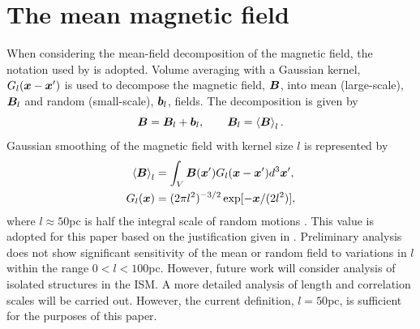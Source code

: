 \documentclass[useAMS,usenatbib]{mn2e}
\begin{document}
\section{The mean magnetic field}
When considering the mean-field decomposition of the magnetic field, the notation used by \citep{GSSFM13} is adopted.
Volume averaging with a Gaussian kernel, $G_{l}(\boldsymbol{x}-\boldsymbol{x}')$ is used to decompose the magnetic field, $\boldsymbol{B}$, into mean (large-scale), $\boldsymbol{B}_{l}$ and random (small-scale), $\boldsymbol{b}_{l}$, fields. The decomposition is given by 
\begin{equation}
\boldsymbol{B} = \boldsymbol{B}_{l}+\boldsymbol{b}_{l},\qquad \boldsymbol{B}_{l} = \left<\boldsymbol{B}\right>_{l}. \label{decomp} 
\end{equation}
Gaussian smoothing of the magnetic field with kernel size $l$ is represented by
\begin{align}
\left<\boldsymbol{B}\right>_{l}&=\int_{V}\boldsymbol{B}(\boldsymbol{x}')G_{l}(\boldsymbol{x}-\boldsymbol{x}')d^{3}\boldsymbol{x}',\\
G_{l}(\boldsymbol{x})&=(2\pi l^2)^{-3/2}\exp[-\boldsymbol{x}/(2l^2)],\nonumber
\label{gauss}
\end{align} 
where $l\approx50$pc is half the integral scale of random motions \citep{GSSFM13}. This value is adopted for this paper based on the justification given in \citep{gent2}.  Preliminary analysis does not show significant sensitivity of the mean or random field to variations in $l$ within the range $0<l<100$pc. However, future work will consider analysis of isolated structures in the ISM. A more detailed analysis of length and correlation scales will be carried out. However, the current definition, $l=50$pc, is sufficient for the purposes of this paper. 

\end{document}
